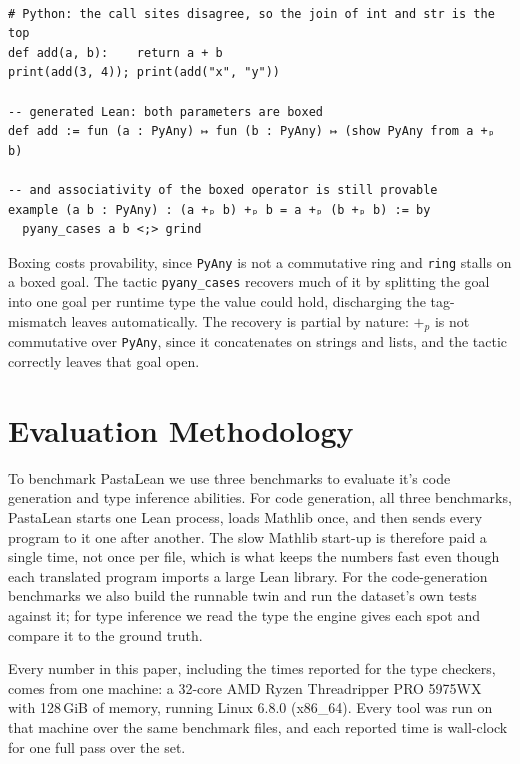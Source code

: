 \documentclass{article}
\newcommand{\code}{\lstinline}
\begin{document}
\begin{lstlisting}[style=lean,caption={One \code{add} used at two types: the parameters box to \code{PyAny}, and a property of the boxed function is still proved.},label={lst:poly-any}]

# Python: the call sites disagree, so the join of int and str is the top
def add(a, b):    return a + b
print(add(3, 4)); print(add("x", "y"))

-- generated Lean: both parameters are boxed
def add := fun (a : PyAny) ↦ fun (b : PyAny) ↦ (show PyAny from a +ₚ b)

-- and associativity of the boxed operator is still provable
example (a b : PyAny) : (a +ₚ b) +ₚ b = a +ₚ (b +ₚ b) := by
  pyany_cases a b <;> grind
\end{lstlisting}

Boxing costs provability, since \code{PyAny} is not a commutative ring and \code{ring} stalls on a boxed goal. The tactic \code{pyany_cases} recovers much of it by splitting the goal into one goal per runtime type the value could hold, discharging the tag-mismatch leaves automatically. The recovery is partial by nature: $+_p$ is not commutative over \code{PyAny}, since it concatenates on strings and lists, and the tactic correctly leaves that goal open.

\section{Evaluation Methodology}\label{app:methodology}

To benchmark PastaLean we use three benchmarks to evaluate it's code generation and type inference abilities. For code generation, all three benchmarks, PastaLean starts one Lean process, loads Mathlib once, and then sends every program to it one after another. The slow Mathlib start-up is therefore paid a single time, not once per file, which is what keeps the numbers fast even though each translated program imports a large Lean library. For the code-generation benchmarks we also build the runnable twin and run the dataset's own tests against it; for type inference we read the type the engine gives each spot and compare it to the ground truth.

Every number in this paper, including the times reported for the type checkers, comes from one machine: a 32-core AMD Ryzen Threadripper PRO 5975WX with 128\,GiB of memory, running Linux 6.8.0 (x86\_64). Every tool was run on that machine over the same benchmark files, and each reported time is wall-clock for one full pass over the set.
\end{document}
